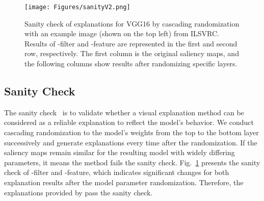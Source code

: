 \begin{figure}[htbp]
  \centering
   \texttt{[image: Figures/sanityV2.png]}
   \caption{Sanity check of \name{} explanations for VGG16 by cascading randomization with an example image (shown on the top left) from ILSVRC.
   Results of \name{}-filter and \name{}-feature are represented in the first and second row, respectively.
   The first column is the original saliency maps, and the following columns show results after randomizing specific layers.}
   \label{fig:sanity}
\end{figure}


\subsection{Sanity Check}
The sanity check~\cite{adebayo2018sanity} is to validate whether a visual explanation method can be considered as a reliable explanation to reflect the model’s behavior.
We conduct cascading randomization to the model's weights from the top to the bottom layer successively and generate explanations every time after the randomization.
If the saliency maps remain similar for the resulting model with widely differing parameters, it means the method fails the sanity check.
Fig.~\ref{fig:sanity} presents the sanity check of \name{}-filter and \name{}-feature, which indicates significant changes for both explanation results after the model parameter randomization.
Therefore, the explanations provided by \name{} pass the sanity check.
